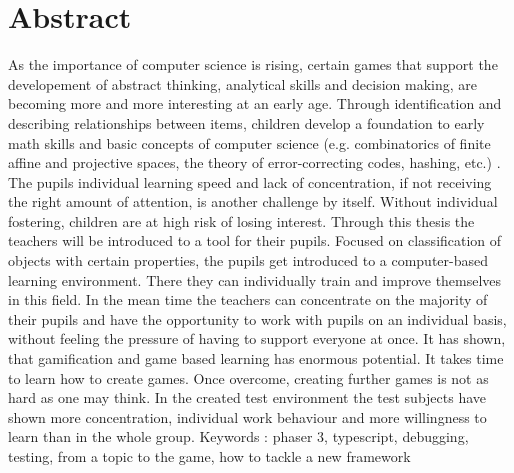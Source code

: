 
\chapter*{Abstract}

As the importance of computer science is rising, certain games that support the
developement of abstract thinking, analytical skills and decision making, are
becoming more and more interesting at an early age. Through identification and
describing relationships between items, children develop a foundation to early
math skills and basic concepts of computer science (e.g. combinatorics of finite
affine and projective spaces, the theory of error-correcting codes, hashing, etc.)
\cite{SET}. The pupils individual learning speed and lack of concentration, if
not receiving the right amount of attention, is another challenge by itself.
Without individual fostering, children are at high risk of losing interest.
Through this thesis the teachers will be introduced to a tool for their pupils.
Focused on classification of objects with certain properties, the pupils get
introduced to a computer-based learning environment. There they can individually
train and improve themselves in this field. In the mean time the teachers can
concentrate on the majority of their pupils and have the opportunity to work with
pupils on an individual basis, without feeling the pressure of having to support
everyone at once.
It has shown, that gamification and game based learning has enormous potential.
It takes time to learn how to create games. Once overcome, creating further games
is not as hard as one may think. In the created test environment the test subjects
have shown more concentration, individual work behaviour and more willingness to
learn than in the whole group.
Keywords : phaser 3, typescript, debugging, testing, from a topic to the game, how to tackle a new framework

